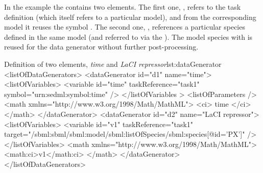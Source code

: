 In the example the  contains two  elements. 
The first one, , refers to the task definition  (which itself refers to a particular model), and from the corresponding model it reuses the symbol . The second one, , references a particular species defined in the same model (and referred to via the ). The model species with   is reused for the data generator  without further post-processing.
\begin{myXmlLst}{Definition of two  elements, \emph{time} and \emph{LaCI repressor}}{lst:dataGenerator}
<listOfDataGenerators>
	<dataGenerator id="d1" name="time">
		<listOfVariables>
			<variable id="time" taskReference="task1" symbol="urn:sedml:symbol:time" />
		</listOfVariables >
		<listOfParameters />
		<math xmlns="http://www.w3.org/1998/Math/MathML">
			<ci> time </ci>
		</math>
	</dataGenerator>
	<dataGenerator id="d2" name="LaCI repressor">
		<listOfVariables>
			<variable id="v1" taskReference="task1" 
				target="/sbml:sbml/sbml:model/sbml:listOfSpecies/sbml:species[@id='PX']" />
		</listOfVariables>
		<math xmlns="http://www.w3.org/1998/Math/MathML">
			<math:ci>v1</math:ci>
		</math>
	</dataGenerator>
</listOfDataGenerators>
\end{myXmlLst}


